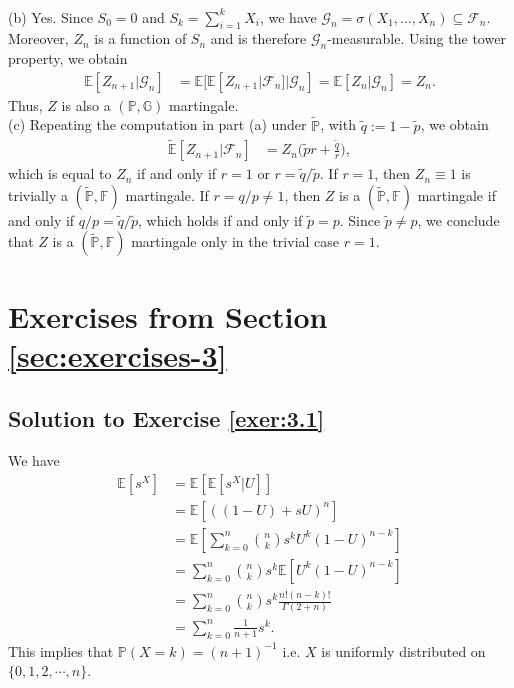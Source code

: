\documentclass[12pt]{book}
\numberwithin{equation}{chapter}
\theoremstyle{plain}
\numberwithin{theorem}{section}
\theoremstyle{definition}
\numberwithin{exercise}{chapter}
\newcommand{\<}{\langle}
\renewcommand{\>}{\rangle}
\renewcommand{\(}{\left(}
\renewcommand{\)}{\right)}
\renewcommand{\[}{\left[}
\renewcommand{\]}{\right]}
\newcommand\Eb{\mathds{E}}
\newcommand\Fb{\mathds{F}}
\newcommand\Gb{\mathds{G}}
\newcommand\Pb{\mathds{P}}
\newcommand\Fc{\mathscr{F}}
\newcommand\Gc{\mathscr{G}}
\newcommand\sig{\sigma}
\newcommand\Ebt{\widetilde{\Eb}}
\newcommand\Pbt{\widetilde{\Pb}}
\newcommand\pt{\widetilde{p}}
\begin{document}
\\[0.5em]
(b) Yes.  Since $S_0 = 0$ and $S_k = \sum_{i=1}^k X_i$, we have $\Gc_n = \sig(X_1,\ldots,X_n) \subseteq \Fc_n$.  Moreover, $Z_n$ is a function of $S_n$ and is therefore $\Gc_n$-measurable.  Using the tower property, we obtain
\begin{align}
\Eb[ Z_{n+1} | \Gc_n ]
	&=	\Eb[ \Eb[ Z_{n+1} | \Fc_n ] | \Gc_n ]
	=		\Eb[ Z_n | \Gc_n ]
	=		Z_n .
\end{align}
Thus, $Z$ is also a $(\Pb,\Gb)$ martingale.
\\[0.5em]
(c) Repeating the computation in part (a) under $\Pbt$, with $\widetilde{q} := 1 - \pt$, we obtain
\begin{align}
\Ebt[ Z_{n+1} | \Fc_n]
	&=	Z_n \Big( \pt r + \frac{\widetilde{q}}{r} \Big) ,
\end{align}
which is equal to $Z_n$ if and only if $r = 1$ or $r = \widetilde{q}/\pt$.  If $r = 1$, then $Z_n \equiv 1$ is trivially a $(\Pbt,\Fb)$ martingale.  If $r = q/p \neq 1$, then $Z$ is a $(\Pbt,\Fb)$ martingale if and only if $q/p = \widetilde{q}/\pt$, which holds if and only if $\pt = p$.  Since $\pt \neq p$, we conclude that $Z$ is a $(\Pbt,\Fb)$ martingale only in the trivial case $r = 1$.


\section{Exercises from Section \ref{sec:exercises-3}}

\subsection*{Solution to Exercise \ref{exer:3.1}}
We have
\begin{align}
\Eb[ s^X]
	&= \Eb[ \Eb[ s^X | U] ] \\
	&= \Eb[ \( (1-U) + s U \)^n ] \\
	&= \Eb\[ \sum_{k=0}^n \binom{n}{k} s^k U^k (1-U)^{n-k} \] \\
	&= \sum_{k=0}^n \binom{n}{k} s^k \Eb[ U^k (1-U)^{n-k} ] \\
	&= \sum_{k=0}^n \binom{n}{k} s^k \frac{n! (n-k)!}{\Gamma(2 +n )} \\
	&= \sum_{k=0}^n \frac{1}{n+1} s^k.
\end{align}
This implies that $\Pb( X = k) = (n+1)^{-1}$ i.e. $X$ is uniformly distributed on $\{0,1,2,\cdots,n\}$. 
\end{document}
